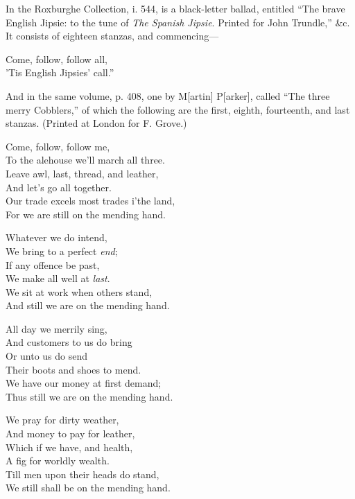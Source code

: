 In the Roxburghe Collection, i. 544, is a black-letter ballad, entitled “The
brave English Jipsie: to the tune of \textit{The Spanish Jipsie}. Printed for John
Trundle,” \&c. It consists of eighteen stanzas, and commencing—
\settowidth{\versewidth}{’Tis English Jipsies’ call.”}
\begin{scverse}Come, follow, follow all,\\
’Tis English Jipsies’ call.”
\end{scverse}
And in the same volume, p. 408, one by M[artin] P[arker], called “The three
merry Cobblers,” of which the following are the first, eighth, fourteenth, and last
stanzas. (Printed at London for F. Grove.)
\settowidth{\versewidth}{Our trade excels most trades i’the land,}
\begin{dcverse}\begin{patverse}
\vin Come, follow, follow me,\\
To the alehouse we’ll march all three.\\
Leave awl, last, thread, and leather,\\
And let’s go all together.\\
Our trade excels most trades i’the land,\\
For we are still on the mending hand.
\end{patverse}

\begin{patverse}
\vin Whatever we do intend,\\
We bring to a perfect \textit{end};\\
If any offence be past,\\
We make all well at \textit{last}.\\
We sit at work when others stand,\\
And still we are on the mending hand.
\end{patverse}

\begin{patverse}
\vin All day we merrily sing,\\
And customers to us do bring\\
Or unto us do send\\
Their boots and shoes to mend.\\
We have our money at first demand;\\
Thus still we are on the mending hand.
\end{patverse}

\begin{patverse}
\vin We pray for dirty weather,\\
And money to pay for leather,\\
Which if we have, and health,\\
A fig for worldly wealth.\\
Till men upon their heads do stand,\\
We still shall be on the mending hand.
\end{patverse}
\end{dcverse}
\pagebreak


